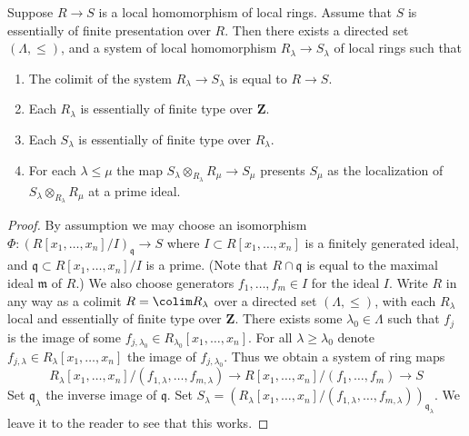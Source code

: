 \begin{lemma}
\label{lemma-limit-essentially-finite-presentation}
Suppose $R \to S$ is a local homomorphism of local rings.
Assume that $S$ is essentially of finite presentation over $R$.
Then there exists a directed set $(\Lambda, \leq)$, and
a system of local homomorphism $R_\lambda \to S_\lambda$
of local rings such that
\begin{enumerate}
\item The colimit of the system $R_\lambda \to S_\lambda$
is equal to $R \to S$.
\item Each $R_\lambda$ is essentially of finite type
over $\mathbf{Z}$.
\item Each $S_\lambda$ is essentially of finite type
over $R_\lambda$.
\item For each $\lambda \leq \mu$ the map
$S_\lambda \otimes_{R_\lambda} R_\mu \to S_\mu$
presents $S_\mu$ as the localization of
$S_\lambda \otimes_{R_\lambda} R_\mu$
at a prime ideal.
\end{enumerate}
\end{lemma}

\begin{proof}
By assumption we may choose an isomorphism
$\Phi : (R[x_1, \ldots, x_n]/I)_{\mathfrak q} \to S$
where $I \subset R[x_1, \ldots, x_n]$ is a finitely generated ideal,
and $\mathfrak q \subset R[x_1, \ldots, x_n]/I$ is a prime.
(Note that $R \cap \mathfrak q$
is equal to the maximal ideal $\mathfrak m$ of $R$.)
We also choose generators $f_1, \ldots, f_m \in I$ for the ideal $I$.
Write $R$ in any way as a colimit $R = \colim R_\lambda$
over a directed set $(\Lambda, \leq )$, with each $R_\lambda$
local and essentially of finite type over $\mathbf{Z}$.
There exists some $\lambda_0 \in \Lambda$ such that $f_j$ is the image
of some $f_{j, \lambda_0} \in R_{\lambda_0}[x_1, \ldots, x_n]$.
For all $\lambda \geq \lambda_0$ denote
$f_{j, \lambda} \in R_{\lambda}[x_1, \ldots, x_n]$ the image
of $f_{j, \lambda_0}$. Thus we obtain a system of ring maps
$$
R_\lambda[x_1, \ldots, x_n]/(f_{1, \lambda}, \ldots, f_{m, \lambda})
\to
R[x_1, \ldots, x_n]/(f_1, \ldots, f_m) \to S
$$
Set $\mathfrak q_\lambda$ the inverse image of $\mathfrak q$.
Set $S_\lambda = (R_\lambda[x_1, \ldots, x_n]/
(f_{1, \lambda}, \ldots, f_{m, \lambda}))_{\mathfrak q_\lambda}$.
We leave it to the reader to see that this works.
\end{proof}
